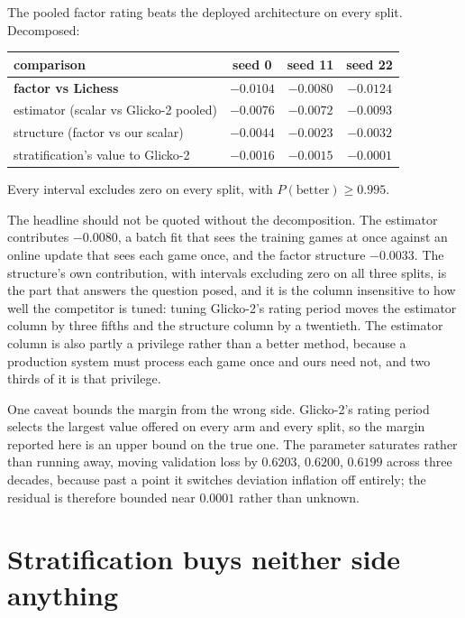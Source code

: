 \documentclass[11pt]{article}
\begin{document}
\noindent The pooled factor rating beats the deployed architecture on
every split. Decomposed:

\begin{center}
\begin{tabular}{lccc}
\toprule
comparison & seed 0 & seed 11 & seed 22 \\
\midrule
\textbf{factor vs Lichess} & $-0.0104$ & $-0.0080$ & $-0.0124$ \\
estimator (scalar vs Glicko-2 pooled) & $-0.0076$ & $-0.0072$ & $-0.0093$ \\
structure (factor vs our scalar) & $-0.0044$ & $-0.0023$ & $-0.0032$ \\
stratification's value to Glicko-2 & $-0.0016$ & $-0.0015$ & $-0.0001$ \\
\bottomrule
\end{tabular}
\end{center}

\noindent Every interval excludes zero on every split, with
$P(\text{better}) \ge 0.995$.

The headline should not be quoted without the decomposition. The
estimator contributes $-0.0080$, a batch fit that sees the training
games at once against an online update that sees each game once, and
the factor structure $-0.0033$. The structure's own contribution, with
intervals excluding zero on all three splits, is the part that answers
the question posed, and it is the column insensitive to how well the
competitor is tuned: tuning Glicko-2's rating period moves the
estimator column by three fifths and the structure column by a
twentieth. The estimator column is also partly a
privilege rather than a better method, because a production system must
process each game once and ours need not, and two thirds of it is that
privilege.

One caveat bounds the margin from the wrong side. Glicko-2's
rating period selects the largest value offered on every arm and every
split, so the margin reported here is an upper bound on the true one.
The parameter saturates rather than running away, moving validation
loss by $0.6203$, $0.6200$, $0.6199$ across three decades, because past
a point it switches deviation inflation off entirely; the residual is
therefore bounded near $0.0001$ rather than unknown.

\section{Stratification buys neither side anything}
\end{document}
